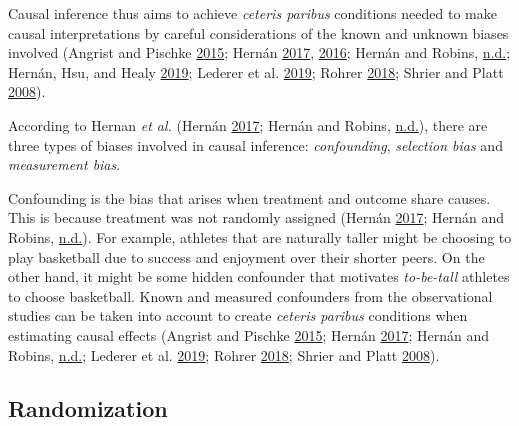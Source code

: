 \documentclass[
]{book}
\begin{document}
Causal inference thus aims to achieve \emph{ceteris paribus} conditions needed to make causal interpretations by careful considerations of the known and unknown biases involved (Angrist and Pischke \protect\hyperlink{ref-angristMasteringMetricsPath2015}{2015}; Hernán \protect\hyperlink{ref-hernanCausalDiagramsDraw2017}{2017}, \protect\hyperlink{ref-hernanDoesWaterKill2016}{2016}; Hernán and Robins, \protect\hyperlink{ref-hernanCausalInference2019}{n.d.}; Hernán, Hsu, and Healy \protect\hyperlink{ref-hernanSecondChanceGet2019}{2019}; Lederer et al. \protect\hyperlink{ref-ledererControlConfoundingReporting2019}{2019}; Rohrer \protect\hyperlink{ref-rohrerThinkingClearlyCorrelations2018}{2018}; Shrier and Platt \protect\hyperlink{ref-shrierReducingBiasDirected2008}{2008}).

According to Hernan \emph{et al.} (Hernán \protect\hyperlink{ref-hernanCausalDiagramsDraw2017}{2017}; Hernán and Robins, \protect\hyperlink{ref-hernanCausalInference2019}{n.d.}), there are three types of biases involved in causal inference: \emph{confounding}, \emph{selection bias} and \emph{measurement bias}.

Confounding is the bias that arises when treatment and outcome share causes. This is because treatment was not randomly assigned (Hernán \protect\hyperlink{ref-hernanCausalDiagramsDraw2017}{2017}; Hernán and Robins, \protect\hyperlink{ref-hernanCausalInference2019}{n.d.}). For example, athletes that are naturally taller might be choosing to play basketball due to success and enjoyment over their shorter peers. On the other hand, it might be some hidden confounder that motivates \emph{to-be-tall} athletes to choose basketball. Known and measured confounders from the observational studies can be taken into account to create \emph{ceteris paribus} conditions when estimating causal effects (Angrist and Pischke \protect\hyperlink{ref-angristMasteringMetricsPath2015}{2015}; Hernán \protect\hyperlink{ref-hernanCausalDiagramsDraw2017}{2017}; Hernán and Robins, \protect\hyperlink{ref-hernanCausalInference2019}{n.d.}; Lederer et al. \protect\hyperlink{ref-ledererControlConfoundingReporting2019}{2019}; Rohrer \protect\hyperlink{ref-rohrerThinkingClearlyCorrelations2018}{2018}; Shrier and Platt \protect\hyperlink{ref-shrierReducingBiasDirected2008}{2008}).

\hypertarget{randomization}{%
\subsection{Randomization}\label{randomization}}
\end{document}
